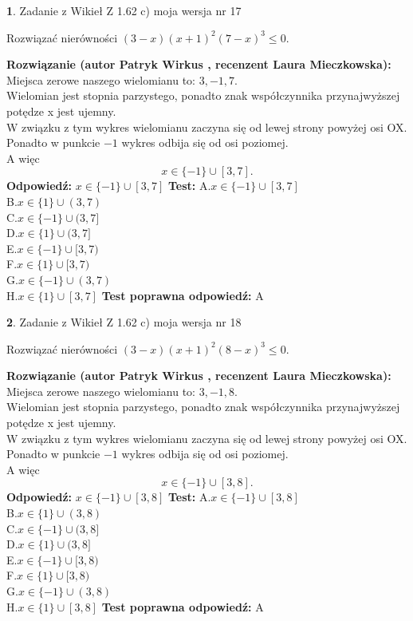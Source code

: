 \documentclass[12pt, a4paper]{article}
\theoremstyle{definition} %
\newtheorem{zad}{}
\newcommand{\zadStart}[1]{\begin{zad}#1\newline}
\newcommand{\zadStop}{\end{zad}}
\newcommand{\rozwStart}[2]{\noindent \textbf{Rozwiązanie (autor #1 , recenzent #2): }\newline}
\newcommand{\rozwStop}{\newline}
\newcommand{\odpStart}{\noindent \textbf{Odpowiedź:}\newline}
\newcommand{\odpStop}{\newline}
\newcommand{\testStart}{\noindent \textbf{Test:}\newline}
\newcommand{\testStop}{\newline}
\newcommand{\kluczStart}{\noindent \textbf{Test poprawna odpowiedź:}\newline}
\newcommand{\kluczStop}{\newline}
\begin{document}
\zadStart{Zadanie z Wikieł Z 1.62 c) moja wersja nr 17}

Rozwiązać nierówności $(3-x)(x+1)^{2}(7-x)^{3}\le0$.
\zadStop
\rozwStart{Patryk Wirkus}{Laura Mieczkowska}
Miejsca zerowe naszego wielomianu to: $3, -1, 7$.\\
Wielomian jest stopnia parzystego, ponadto znak współczynnika przy\linebreak najwyższej potędze x jest ujemny.\\ W związku z tym wykres wielomianu zaczyna się od lewej strony powyżej osi OX.\\
Ponadto w punkcie $-1$ wykres odbija się od osi poziomej.\\
A więc $$x \in \{-1\} \cup [3,7].$$
\rozwStop
\odpStart
$x \in \{-1\} \cup [3,7]$
\odpStop
\testStart
A.$x \in \{-1\} \cup [3,7]$\\
B.$x \in \{1\} \cup (3,7)$\\
C.$x \in \{-1\} \cup (3,7]$\\
D.$x \in \{1\} \cup (3,7]$\\
E.$x \in \{-1\} \cup [3,7)$\\
F.$x \in \{1\} \cup [3,7)$\\
G.$x \in \{-1\} \cup (3,7)$\\
H.$x \in \{1\} \cup [3,7]$
\testStop
\kluczStart
A
\kluczStop



\zadStart{Zadanie z Wikieł Z 1.62 c) moja wersja nr 18}

Rozwiązać nierówności $(3-x)(x+1)^{2}(8-x)^{3}\le0$.
\zadStop
\rozwStart{Patryk Wirkus}{Laura Mieczkowska}
Miejsca zerowe naszego wielomianu to: $3, -1, 8$.\\
Wielomian jest stopnia parzystego, ponadto znak współczynnika przy\linebreak najwyższej potędze x jest ujemny.\\ W związku z tym wykres wielomianu zaczyna się od lewej strony powyżej osi OX.\\
Ponadto w punkcie $-1$ wykres odbija się od osi poziomej.\\
A więc $$x \in \{-1\} \cup [3,8].$$
\rozwStop
\odpStart
$x \in \{-1\} \cup [3,8]$
\odpStop
\testStart
A.$x \in \{-1\} \cup [3,8]$\\
B.$x \in \{1\} \cup (3,8)$\\
C.$x \in \{-1\} \cup (3,8]$\\
D.$x \in \{1\} \cup (3,8]$\\
E.$x \in \{-1\} \cup [3,8)$\\
F.$x \in \{1\} \cup [3,8)$\\
G.$x \in \{-1\} \cup (3,8)$\\
H.$x \in \{1\} \cup [3,8]$
\testStop
\kluczStart
A
\kluczStop
\end{document}
